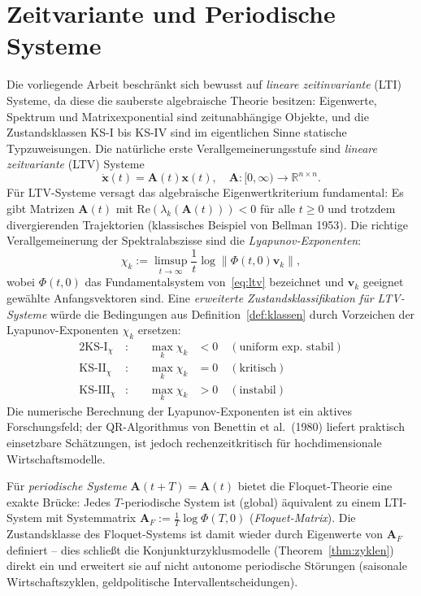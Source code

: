 ﻿\documentclass[12pt, a4paper, titlepage]{report}
\theoremstyle{definition}
\theoremstyle{remark}
\newcommand{\R}{\mathbb{R}}
\newcommand{\vx}{\bm{x}}
\newcommand{\vA}{\bm{A}}
\newcommand{\re}{\mathrm{Re}}
\newcommand{\KS}{\mathrm{KS}}
\begin{document}
\section{Zeitvariante und Periodische Systeme}
\label{subsec:zeitvariant}

Die vorliegende Arbeit beschränkt sich bewusst auf \emph{lineare zeitinvariante} (LTI)
Systeme, da diese die sauberste algebraische Theorie besitzen: Eigenwerte, Spektrum und
Matrixexponential sind zeitunabhängige Objekte, und die Zustandsklassen KS-I bis KS-IV
sind im eigentlichen Sinne statische Typzuweisungen. Die natürliche erste
Verallgemeinerungsstufe sind \emph{lineare zeitvariante} (LTV) Systeme
\begin{equation}
  \dot{\vx}(t) = \vA(t)\vx(t), \quad \vA : [0,\infty) \to \R^{n \times n}.
  \label{eq:ltv}
\end{equation}
Für LTV-Systeme versagt das algebraische Eigenwertkriterium fundamental: Es gibt
Matrizen $\vA(t)$ mit $\re(\lambda_k(\vA(t))) < 0$ für alle $t \geq 0$ und trotzdem
divergierenden Trajektorien (klassisches Beispiel von Bellman 1953). Die richtige
Verallgemeinerung der Spektralabszisse sind die \emph{Lyapunov-Exponenten}:
\begin{equation}
  \chi_k := \limsup_{t \to \infty} \frac{1}{t} \log \| \Phi(t,0)\bm{v}_k \|,
  \label{eq:lyapunov_exp}
\end{equation}
wobei $\Phi(t,0)$ das Fundamentalsystem von~\eqref{eq:ltv} bezeichnet und $\bm{v}_k$
geeignet gewählte Anfangsvektoren sind. Eine \emph{erweiterte Zustandsklassifikation
für LTV-Systeme} würde die Bedingungen aus Definition~\ref{def:klassen} durch
Vorzeichen der Lyapunov-Exponenten $\chi_k$ ersetzen:
\begin{alignat}{2}
  \KS\text{-I}_\chi  &:\quad &\max_k \chi_k &< 0 \quad (\text{uniform exp. stabil})\\
  \KS\text{-II}_\chi &:\quad &\max_k \chi_k &= 0 \quad (\text{kritisch})\\
  \KS\text{-III}_\chi&:\quad &\max_k \chi_k &> 0 \quad (\text{instabil})
\end{alignat}
Die numerische Berechnung der Lyapunov-Exponenten ist ein aktives Forschungsfeld;
der QR-Algorithmus von Benettin et al.~(1980) liefert praktisch einsetzbare Schätzungen,
ist jedoch rechenzeitkritisch für hochdimensionale Wirtschaftsmodelle.

Für \emph{periodische Systeme} $\vA(t+T) = \vA(t)$ bietet die Floquet-Theorie
eine exakte Brücke: Jedes $T$-periodische System ist (global) äquivalent zu einem
LTI-System mit Systemmatrix $\vA_F := \frac{1}{T}\log \Phi(T,0)$ (\emph{Floquet-Matrix}).
Die Zustandsklasse des Floquet-Systems ist damit wieder durch Eigenwerte von $\vA_F$
definiert -- dies schließt die Konjunkturzyklusmodelle (Theorem~\ref{thm:zyklen}) direkt
ein und erweitert sie auf nicht autonome periodische Störungen (saisonale Wirtschaftszyklen,
geldpolitische Intervall\-entscheidungen).
\end{document}
